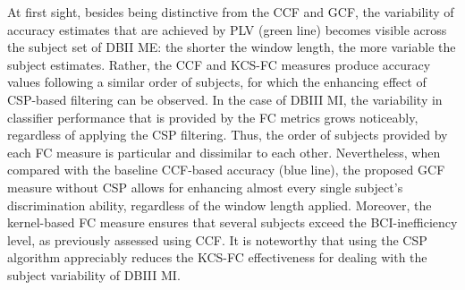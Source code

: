 At first sight, besides being distinctive from the CCF and GCF, the variability of accuracy estimates that are achieved by PLV (green line) becomes visible across the subject set of DBII ME: the shorter the window length, the more variable the subject estimates. Rather, the CCF and KCS-FC measures produce accuracy values following a similar order of subjects, for which the enhancing effect of CSP-based filtering can be observed. In the case of DBIII MI, the variability in classifier performance that is provided by the FC metrics grows noticeably, regardless of applying the CSP filtering. Thus, the order of subjects provided by each FC measure is particular and dissimilar to each other. Nevertheless, when compared with the baseline CCF-based accuracy (blue line), the proposed GCF measure without CSP allows for enhancing almost every single subject's discrimination ability, regardless of the window length applied. Moreover, the kernel-based FC measure ensures that several subjects exceed the BCI-inefficiency level, as previously assessed using CCF. It is noteworthy that using the CSP algorithm appreciably reduces the KCS-FC effectiveness for dealing with the subject variability of DBIII MI. 


